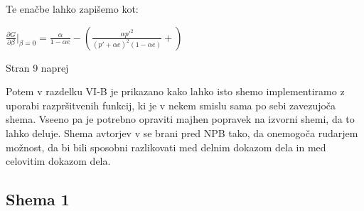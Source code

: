 \documentclass[12pt]{article}
\begin{document}
Te enačbe lahko zapišemo kot:\newline

$\frac{\partial G}{\partial \beta}|_{\beta=0} =
\frac{\alpha}{1-\alpha e} - (
\frac{\alpha p'^2}{(p' + \alpha e)^2(1-\alpha e)} + )$

\newpage 
Stran 9 naprej

Potem v razdelku VI-B je prikazano kako lahko isto shemo implementiramo z uporabi razpršitvenih funkcij, ki je v nekem smislu sama po sebi zavezujoča shema. Vseeno pa je potrebno opraviti majhen popravek na izvorni shemi, da to lahko deluje. Shema avtorjev v \cite{originalarticle} se brani pred NPB tako, da onemogoča rudarjem možnost, da bi bili sposobni razlikovati med delnim dokazom dela in med celovitim dokazom dela.

\subsection{Shema 1}
\end{document}
